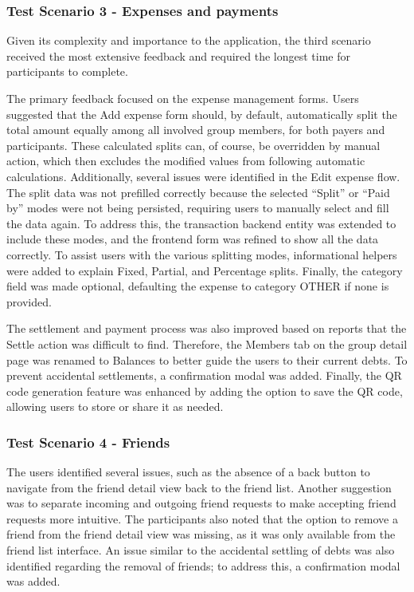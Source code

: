 \documentclass{ctuthesis}
\begin{document}
\subsubsection{Test Scenario 3 - Expenses and payments}
Given its complexity and importance to the application, the third scenario received the most extensive feedback and required the longest time for participants to complete.

The primary feedback focused on the expense management forms. Users suggested that the Add expense form should, by default, automatically split the total amount equally among all involved group members, for both payers and participants. These calculated splits can, of course, be overridden by manual action, which then excludes the modified values from following automatic calculations. Additionally, several issues were identified in the Edit expense flow. The split data was not prefilled correctly because the selected ``Split'' or ``Paid by'' modes were not being persisted, requiring users to manually select and fill the data again. To address this, the transaction backend entity was extended to include these modes, and the frontend form was refined to show all the data correctly. To assist users with the various splitting modes, informational helpers were added to explain Fixed, Partial, and Percentage splits. Finally, the category field was made optional, defaulting the expense to category OTHER if none is provided.

The settlement and payment process was also improved based on reports that the Settle action was difficult to find. Therefore, the Members tab on the group detail page was renamed to Balances to better guide the users to their current debts. To prevent accidental settlements, a confirmation modal was added. Finally, the QR code generation feature was enhanced by adding the option to save the QR code, allowing users to store or share it as needed.

\subsubsection{Test Scenario 4 - Friends}

The users identified several issues, such as the absence of a back button to navigate from the friend detail view back to the friend list. Another suggestion was to separate incoming and outgoing friend requests to make accepting friend requests more intuitive. The participants also noted that the option to remove a friend from the friend detail view was missing, as it was only available from the friend list interface. An issue similar to the accidental settling of debts was also identified regarding the removal of friends; to address this, a confirmation modal was added.
\end{document}
